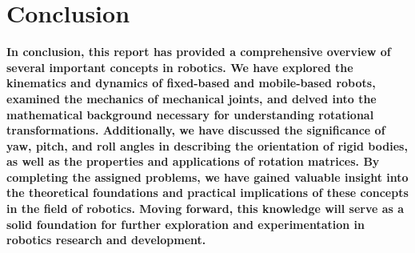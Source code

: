 \documentclass[conference]{IEEEtran}
\begin{document}
\vspace{12pt}

\section{Conclusion}
\textbf{
    In conclusion, this report has provided a comprehensive overview of several important concepts in robotics. We have explored the kinematics and dynamics of fixed-based and mobile-based robots, examined the mechanics of mechanical joints, and delved into the mathematical background necessary for understanding rotational transformations. Additionally, we have discussed the significance of yaw, pitch, and roll angles in describing the orientation of rigid bodies, as well as the properties and applications of rotation matrices. By completing the assigned problems, we have gained valuable insight into the theoretical foundations and practical implications of these concepts in the field of robotics. Moving forward, this knowledge will serve as a solid foundation for further exploration and experimentation in robotics research and development.
}
    
\end{document}
